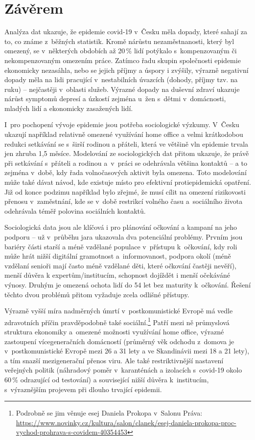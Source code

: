\section*{Závěrem}

Analýza dat  ukazuje, že epidemie covid-19 v Česku měla dopady, které sahají za to, co známe z běžných statistik. Kromě nárůstu ne\-za\-měst\-na\-nos\-ti, který byl omezený, se v některých obdobích až 20\,\% lidí potýkalo s kompenzovaným či nekompenzovaným omezením práce. Zatímco řadu skupin společnosti epidemie ekonomicky nezasáhla, nebo se jejich příjmy a úspory i zvýšily, výrazně negativní dopady měla na lidi pracující v nestabilních úvazcích (dohody, příjmy tzv. na ruku) – nejčastěji v oblasti služeb. Výrazné dopady na duševní zdraví ukazuje nárůst symptomů depresí a úzkostí zejména u~žen s dětmi v domácnosti, mladých lidí a ekonomicky zasažených lidí.

I~pro pochopení vývoje epidemie jsou potřeba sociologické výzkumy. V Česku ukazují například relativně omezené využívání home office a velmi krátkodobou redukci setkávání se s širší rodinou a přáteli, která ve většině vln epidemie trvala jen zhruba 1,5 měsíce. Modelování ze sociologických dat přitom ukazuje, že právě při setkávání s přáteli a rodinou a v práci se odehrávala většina kontaktů – a to zejména v době, kdy řada volnočasových aktivit byla omezena. Toto modelování může také dávat návod, kde existuje místo pro efektivní protiepidemická opatření. Již od konce podzimu například bylo zřejmé, že musí cílit na omezení rizikovosti přenosu v zaměstnání, kde se v době restrikcí volného času a sociálního života odehrávala téměř polovina sociálních kontaktů.

Sociologická data jsou ale klíčová i pro plánování očkování a kampaní na jeho podporu – už v průběhu jara ukazovala dva potenciální problémy. Prvním jsou bariéry části starší a méně vzdělané populace v přístupu k očkování, kdy roli může hrát nižší digitální gramotnost a informovanost, podpora okolí (méně vzdělaní senioři mají často méně vzdělané děti, které očkování častěji nevěří), menší důvěra k expertům/institucím, schopnost dojíždět i menší očekáváné výnosy. Druhým je omezená ochota lidí do 54 let bez maturity k očkování. Řešení těchto dvou problémů přitom vyžaduje zcela odlišné přístupy.

\newpage

Výrazně vyšší míra nadměrných úmrtí v postkomunistické Evropě má vedle zdravotních příčin pravděpodobně také sociální.\footnote{Podrobně se jim věnuje esej Daniela Prokopa v~Salonu Práva: \url{https://www.novinky.cz/kultura/salon/clanek/esej-daniela-prokopa-proc-vychod-prohrava-s-covidem-40354453}} Patří mezi ně průmyslová struktura ekonomiky a omezené možnosti využívání home office, výrazné zastoupení vícegeneračních domácností (průměrný věk odchodu z domova je v postkomunistické Evropě mezi 26 a 31 lety a ve Skandinávii mezi 18 a 21 lety), a tím snazší mezigenerační přenos viru. Ale také restriktivnější nastavení veřejných politik (náhradový poměr v karanténách a izolacích s covid-19 okolo 60\,\% odrazující od testování) a související nižší důvěra k~institucím, s~výraznějším projevem při dlouho trvající epidemii.


